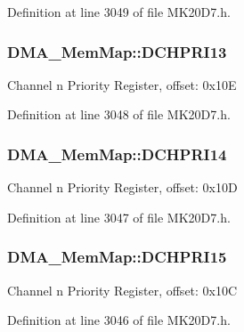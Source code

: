Definition at line 3049 of file M\+K20\+D7.\+h.

\subsubsection[{\texorpdfstring{D\+C\+H\+P\+R\+I13}{DCHPRI13}}]{ D\+M\+A\+\_\+\+Mem\+Map\+::\+D\+C\+H\+P\+R\+I13}\hypertarget{struct_d_m_a___mem_map_aa3206c803f93f959bf68730490eafeac}{}\label{struct_d_m_a___mem_map_aa3206c803f93f959bf68730490eafeac}
Channel n Priority Register, offset\+: 0x10E 

Definition at line 3048 of file M\+K20\+D7.\+h.

\subsubsection[{\texorpdfstring{D\+C\+H\+P\+R\+I14}{DCHPRI14}}]{ D\+M\+A\+\_\+\+Mem\+Map\+::\+D\+C\+H\+P\+R\+I14}\hypertarget{struct_d_m_a___mem_map_af288b352870f7e17dc689a85477818c4}{}\label{struct_d_m_a___mem_map_af288b352870f7e17dc689a85477818c4}
Channel n Priority Register, offset\+: 0x10D 

Definition at line 3047 of file M\+K20\+D7.\+h.

\subsubsection[{\texorpdfstring{D\+C\+H\+P\+R\+I15}{DCHPRI15}}]{ D\+M\+A\+\_\+\+Mem\+Map\+::\+D\+C\+H\+P\+R\+I15}\hypertarget{struct_d_m_a___mem_map_a7938c3c5e450351844c5c6630a5191b2}{}\label{struct_d_m_a___mem_map_a7938c3c5e450351844c5c6630a5191b2}
Channel n Priority Register, offset\+: 0x10C 

Definition at line 3046 of file M\+K20\+D7.\+h.


